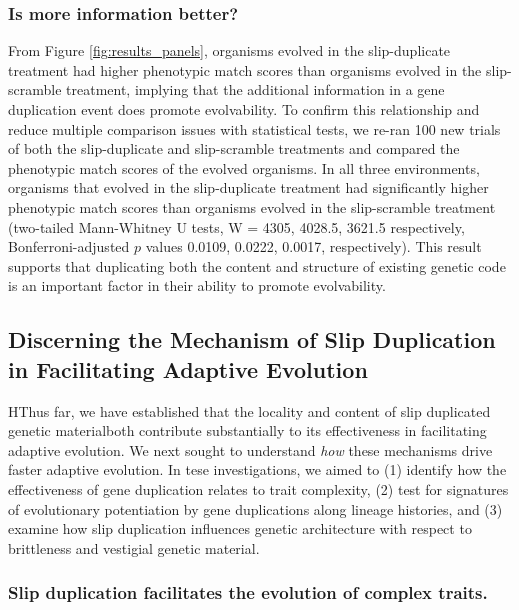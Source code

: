 \subsubsection{Is more information better?}
From Figure \ref{fig:results_panels}, organisms evolved in the slip-duplicate treatment had higher phenotypic match scores than organisms evolved in the slip-scramble treatment, implying that the additional information in a gene duplication event %
does
promote evolvability. To confirm this relationship and reduce multiple comparison issues with statistical tests, we re-ran 100 new trials of both the slip-duplicate and slip-scramble treatments %
and compared the phenotypic match scores of the evolved organisms. In all three environments, organisms that evolved in the slip-duplicate treatment had significantly higher phenotypic match scores than organisms evolved in the slip-scramble treatment (two-tailed Mann-Whitney U tests, W = 4305, 4028.5, 3621.5 respectively, Bonferroni-adjusted $p$ values 0.0109, 0.0222, 0.0017, respectively). This result supports that %
duplicating both the content and structure of existing genetic code is an important factor in their ability to promote evolvability.

\subsection{Discerning the Mechanism of Slip Duplication in Facilitating Adaptive Evolution}

HThus far, we have established that the locality and content of slip duplicated genetic materialboth contribute substantially to its effectiveness in facilitating adaptive evolution.
We next sought to understand \textit{how} these mechanisms drive faster adaptive evolution.
In tese investigations, we aimed to (1) identify how the effectiveness of gene duplication relates to trait complexity, (2) test for signatures of evolutionary potentiation by gene duplications along lineage histories, and (3) examine how slip duplication influences genetic architecture with respect to brittleness and vestigial genetic material.

\subsubsection{Slip duplication facilitates the evolution of complex traits.}

